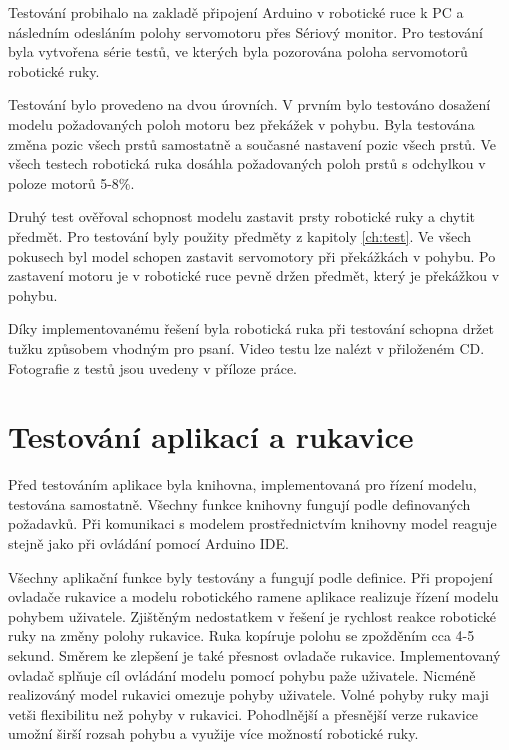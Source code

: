 \documentclass[thesis=B,czech]{FITthesis}[2012/06/26]
\begin{document}
Testování probihalo na zakladě připojení Arduino v robotické ruce k PC a následním odesláním polohy servomotoru přes Sériový monitor. Pro testování byla vytvořena série testů, ve kterých byla pozorována poloha servomotorů robotické ruky.


Testování bylo provedeno na dvou úrovních. V prvním bylo testováno dosažení modelu požadovaných poloh motoru bez překážek v pohybu. Byla testována změna pozic všech prstů samostatně a současné nastavení pozic všech prstů. Ve všech testech robotická ruka dosáhla požadovaných poloh prstů s odchylkou v poloze motorů 5-8\%.


Druhý test ověřoval schopnost modelu zastavit prsty robotické ruky a chytit předmět. Pro testování byly použity předměty z kapitoly \ref{ch:test}. Ve všech pokusech byl model schopen zastavit servomotory při překážkách v pohybu. Po zastavení motoru je v robotické ruce pevně držen předmět, který je překážkou v pohybu.


Díky implementovanému řešení byla robotická ruka při testování schopna držet tužku způsobem vhodným pro psaní. Video testu lze nalézt v přiloženém CD. Fotografie z testů jsou uvedeny v příloze práce.

\section{Testování aplikací a rukavice}

Před testováním aplikace byla knihovna, implementovaná pro řízení modelu, testována samostatně. Všechny funkce knihovny fungují podle definovaných požadavků. Při komunikaci s modelem prostřednictvím knihovny model reaguje stejně jako při ovládání pomocí Arduino IDE.


Všechny aplikační funkce byly testovány a fungují podle definice. Při propojení ovladače rukavice a modelu robotického ramene aplikace realizuje řízení modelu pohybem uživatele. Zjištěným nedostatkem v řešení je rychlost reakce robotické ruky na změny polohy rukavice. Ruka kopíruje polohu se zpožděním cca 4-5 sekund. Směrem ke zlepšení je také přesnost ovladače rukavice. Implementovaný ovladač splňuje cíl ovládání modelu pomocí pohybu paže uživatele. Nicméně realizováný model rukavici omezuje pohyby uživatele. Volné pohyby ruky maji vetši flexibilitu než pohyby v rukavici. Pohodlnější a přesnější verze rukavice umožní širší rozsah pohybu a využije více možností robotické ruky.

        
\end{document}
